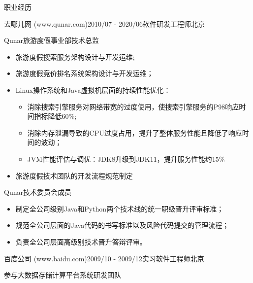 \documentclass{resume} %
\begin{document}
\begin{rSection}{职业经历}

\begin{rSubsection}{去哪儿网 (www.qunar.com)}{2010/07 - 2020/06}{软件研发工程师}{北京}

\item Qunar旅游度假事业部技术总监
  \begin{itemize}
    \item 旅游度假搜索服务架构设计与开发运维;
    \item 旅游度假竞价排名系统架构设计与开发运维；
    \item {
        Linux操作系统和Java虚拟机层面的持续性能优化：
        \begin{itemize}
        \item { 消除搜索引擎服务对网络带宽的过度使用，使搜索引擎服务的P98响应时间指标降低60\%; }
        \item { 消除内存泄漏导致的CPU过度占用，提升了整体服务性能且降低了响应时间的波动； }
        \item { JVM性能评估与调优：JDK8升级到JDK11，提升服务性能约15\% }
        \end{itemize}
      }
    \item 旅游度假技术团队的开发流程规范制定
  \end{itemize}
\item Qunar技术委员会成员
  \begin{itemize}
  \item 制定全公司级别Java和Python两个技术线的统一职级晋升评审标准；
  \item 规范全公司层面的Java代码的书写标准以及风险代码提交的管理流程；
  \item 负责全公司层面高级别技术晋升答辩评审。
  \end{itemize}
  
\end{rSubsection}


\begin{rSubsection}{百度公司 (www.baidu.com)}{2009/10 - 2009/12}{实习软件工程师}{北京}
\item 参与大数据存储计算平台系统研发团队
\end{rSubsection}

\end{rSection}

\end{document}
